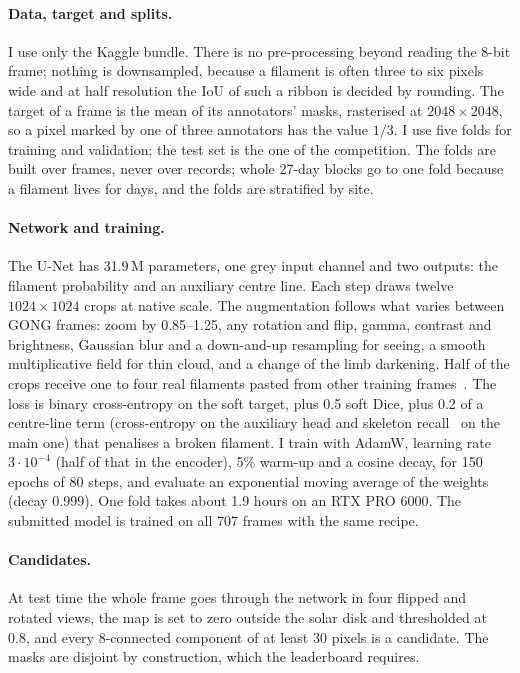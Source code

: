 \documentclass[sigconf]{acmart}
\begin{document}
\paragraph{Data, target and splits.} I use only the Kaggle bundle. There is no pre-processing
beyond reading the 8-bit frame; nothing is downsampled, because a filament is often three to six
pixels wide and at half resolution the IoU of such a ribbon is decided by rounding. The target of
a frame is the mean of its annotators' masks, rasterised at $2048\times2048$, so a pixel marked by
one of three annotators has the value $1/3$. I use five folds for training and validation; the
test set is the one of the competition. The folds are built over frames, never over records;
whole 27-day blocks go to one fold because a filament lives for days, and the folds are
stratified by site.

\paragraph{Network and training.} The U-Net has 31.9\,M parameters, one grey input channel and
two outputs: the filament probability and an auxiliary centre line. Each step draws twelve
$1024\times1024$ crops at native scale. The augmentation follows what varies between GONG
frames: zoom by 0.85--1.25, any rotation and flip, gamma, contrast and brightness, Gaussian blur
and a down-and-up resampling for seeing, a smooth multiplicative field for thin cloud, and a
change of the limb darkening. Half of the crops receive one to four real filaments pasted from
other training frames~\cite{copypaste}. The loss is binary cross-entropy on the soft target,
plus 0.5 soft Dice, plus 0.2 of a centre-line term (cross-entropy on the auxiliary head and
skeleton recall~\cite{skeleton} on the main one) that penalises a broken filament. I train with
AdamW, learning rate $3\cdot10^{-4}$ (half of that in the encoder), 5\% warm-up and a cosine
decay, for 150 epochs of 80 steps, and evaluate an exponential moving average of the weights
(decay 0.999). One fold takes about 1.9 hours on an RTX PRO 6000. The submitted model is trained
on all 707 frames with the same recipe.

\paragraph{Candidates.} At test time the whole frame goes through the network in four flipped
and rotated views, the map is set to zero outside the solar disk and thresholded at 0.8, and
every 8-connected component of at least 30 pixels is a candidate. The masks are disjoint by
construction, which the leaderboard requires.
\end{document}
